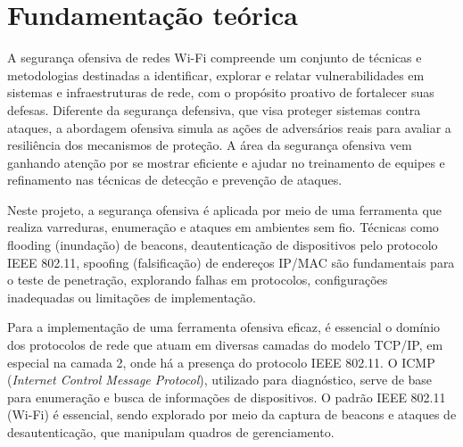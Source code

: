 \section{Fundamentação teórica}

A segurança ofensiva de redes Wi-Fi compreende um conjunto de técnicas e metodologias destinadas a identificar, explorar e relatar vulnerabilidades em sistemas e infraestruturas de rede, com o propósito proativo de fortalecer suas defesas. Diferente da segurança defensiva, que visa proteger sistemas contra ataques, a abordagem ofensiva simula as ações de adversários reais para avaliar a resiliência dos mecanismos de proteção. A área da segurança ofensiva vem ganhando atenção por se mostrar eficiente e ajudar no treinamento de equipes e refinamento nas técnicas de detecção e prevenção de ataques.

Neste projeto, a segurança ofensiva é aplicada por meio de uma ferramenta que realiza varreduras, enumeração e ataques em ambientes sem fio. Técnicas como flooding (inundação) de beacons, deautenticação de dispositivos pelo protocolo IEEE 802.11, spoofing (falsificação) de endereços IP/MAC são fundamentais para o teste de penetração, explorando falhas em protocolos, configurações inadequadas ou limitações de implementação.

Para a implementação de uma ferramenta ofensiva eficaz, é essencial o domínio dos protocolos de rede que atuam em diversas camadas do modelo TCP/IP, em especial na camada 2, onde há a presença do protocolo IEEE 802.11. O ICMP (\textit{Internet Control Message Protocol}), utilizado para diagnóstico, serve de base para enumeração e busca de informações de dispositivos. O padrão IEEE 802.11 (Wi-Fi) é essencial, sendo explorado por meio da captura de beacons e ataques de desautenticação, que manipulam quadros de gerenciamento.